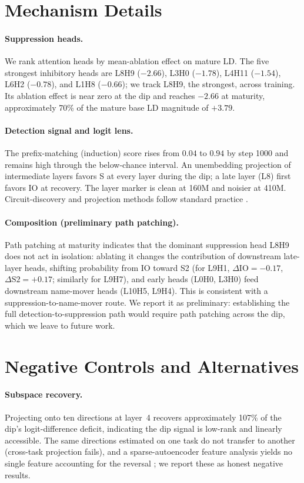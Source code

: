 \documentclass[11pt]{article}
\begin{document}
\section{Mechanism Details}
\paragraph{Suppression heads.}
We rank attention heads by mean-ablation effect on mature LD. The five strongest
inhibitory heads are L8H9 ($-2.66$), L3H0 ($-1.78$), L4H11 ($-1.54$), L6H2
($-0.78$), and L1H8 ($-0.66$); we track L8H9, the strongest, across training.
Its ablation effect is near zero at the dip and reaches $-2.66$ at maturity,
approximately 70\% of the mature base LD magnitude of $+3.79$.

\paragraph{Detection signal and logit lens.}
The prefix-matching (induction) score rises from $0.04$ to $0.94$ by step 1000
and remains high through the below-chance interval. An unembedding projection of
intermediate layers favors S at every layer during the dip; a late layer (L8)
first favors IO at recovery. The layer marker is clean at 160M and noisier at
410M. Circuit-discovery and projection methods follow standard practice
\citep{conmy2023automated,nostalgebraist2020logitlens}.

\paragraph{Composition (preliminary path patching).}
Path patching at maturity indicates that the dominant suppression head L8H9 does
not act in isolation: ablating it changes the contribution of downstream
late-layer heads, shifting probability from IO toward S2 (for L9H1,
$\Delta\mathrm{IO}=-0.17$, $\Delta\mathrm{S2}=+0.17$; similarly for L9H7), and
early heads (L0H0, L3H0) feed downstream name-mover heads (L10H5, L9H4). This is
consistent with a suppression-to-name-mover route. We report it as preliminary:
establishing the full detection-to-suppression path would require path patching
across the dip, which we leave to future work.

\section{Negative Controls and Alternatives}
\paragraph{Subspace recovery.}
Projecting onto ten directions at layer~4 recovers approximately 107\% of the
dip's logit-difference deficit, indicating the dip signal is low-rank and
linearly accessible. The same directions estimated on one task do not transfer to
another (cross-task projection fails), and a sparse-autoencoder feature analysis
yields no single feature accounting for the reversal
\citep{elhage2022superposition,cunningham2024sparse}; we report these as honest
negative results.
\end{document}
